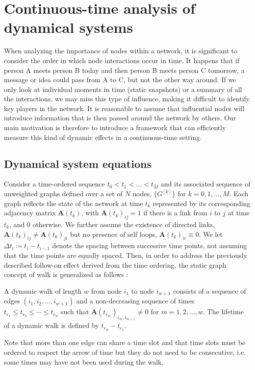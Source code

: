 \chapter{Continuous-time analysis of dynamical systems}
\label{chap:cont}
When analyzing the importance of nodes within a network, it is significant to consider the order in which node interactions occur in time. It happens that if person A meets person B today and then person B meets person C tomorrow, a message or idea could pass from A to C, but not the other way around. If we only look at individual moments in time (static snapshots) or a summary of all the interactions, we may miss this type of influence, making it difficult to identify key players in the network. It is reasonable to assume that influential nodes will introduce information that is then passed around the network by others. Our main motivation is therefore to introduce a framework that can efficiently measure this kind of dynamic effects in a continuous-time setting.

\section{Dynamical system equations}
\label{sec:ode}
Consider a time-ordered sequence $t_0 < t_1 < \dots < t_M $ and its associated sequence of unweighted graphs defined over a set of $N$ nodes, $\{G^{[k]}\}$ for $k = 0,1,\dots,M$. Each graph reflects the state of the network at time $t_k$ represented by its corresponding adjacency matrix $\mathbf{A}(t_k)$, with $\mathbf{A}(t_k)_{ij} = 1$ if there is a link from $i$ to $j$ at time $t_k$, and $0$ otherwise. We further assume the existence of directed links, $\mathbf{A}(t_k)_{ij} \ne \mathbf{A}(t_k)_{ji}$ but no presence of self loops, $\mathbf{A}(t_k)_{ii} \equiv 0$. We let $\Delta t_i \coloneqq t_i - t_{i-1}$ denote the spacing between successive time points, not assuming that the time points are equally spaced. Then, in order to address the previously described follow-on effect derived from the time ordering, the static graph concept of walk is generalized as follows \cite{grindrod2011communicability}:
\begin{definition}
    A dynamic walk of length $w$ from node $i_1$ to node $i_{w+1}$ consists of a sequence of edges $(i_1,i_2,\dots,i_{w+1})$ and a non-decreasing sequence of times $t_{r_1}\le t_{r_2}\le \cdots \le t_{r_w}$ such that $\mathbf{A}(t_{r_m})_{i_m,i_{m+1}}\ne 0$ for $m=1,2,\dots,w$. The lifetime of a dynamic walk is defined by $t_{r_w} - t_{r_1}$. 
\end{definition}
Note that more than one edge can share a time slot and that time slots must be ordered to respect the arrow of time but they do not need to be consecutive, i.e. some times may have not been used during the walk.

